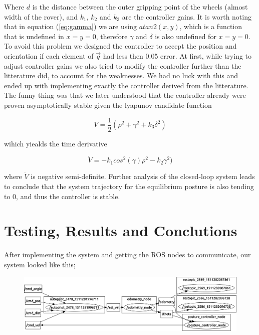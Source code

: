 \documentclass[a4paper,10pt]{article}
\begin{document}
		Where $d$ is the distance between the outer gripping point of the wheels (almost width of the rover), and $k_{1}$, $k_{2}$ and $k_{3}$ are the controller gains.
		It is worth noting that in equation (\ref{eq:gamma}) we are using $atan2(x,y)$, which is a function that is undefined in $x=y=0$, therefore $\gamma$ and $\delta$ is also undefined for $x=y=0$.
		To avoid this problem we designed the controller to accept the position and orientation if each element of $\vec{q}$ had less then 0.05 error. At first, while trying to adjust controller gains 
		we also tried to modify the controller further than the litterature did, to account for the weaknesses. We had no luck with this and ended up with implementing exactly the controller
		derived from the litterature. The funny thing was that we later understood that the controller already were proven asymptotically stable given the lyapunov candidate function

		\begin{equation}
			V = \frac{1}{2}(\rho^2 + \gamma^2 + k_{3}\delta^2)
		\end{equation}

		wihich yiealds the time derivative

		\begin{equation}
			\dot{V} = - k_{1}cos^2(\gamma)\rho^2 - k_{2}\gamma^2)
		\end{equation}

		where $\dot{V}$ is negative semi-definite. Further analysis of the closed-loop system leads to conclude that the system trajectory for the equilibrium posture is also tending to 0, 
		and thus the controller is stable.

		\vspace{10mm}

\section{Testing, Results and Conclutions}

		After implementing the system and getting the ROS nodes to communicate, our system looked like this;

		\begin{figure}[H]
		\centering
		\includegraphics[width=1\textwidth,height=0.2\textheight]{rover2_rqt_graph.png}
 		\label{fig:rqtgraph}
		\end{figure}
\end{document}
